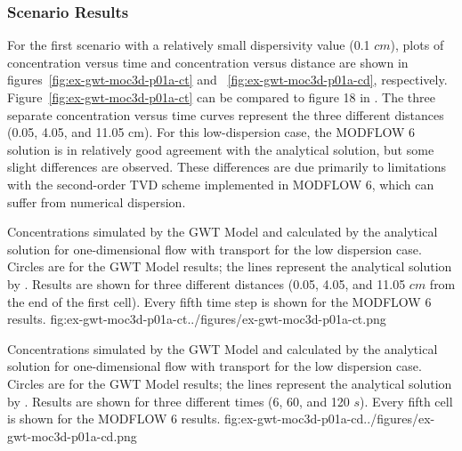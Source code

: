 

\subsubsection{Scenario Results}

For the first scenario with a relatively small dispersivity value (0.1 $cm$), plots of concentration versus time and concentration versus distance are shown in figures~\ref{fig:ex-gwt-moc3d-p01a-ct} and ~\ref{fig:ex-gwt-moc3d-p01a-cd}, respectively.  Figure~\ref{fig:ex-gwt-moc3d-p01a-ct} can be compared to figure 18 in \cite{konikow1996three}. The three separate concentration versus time curves represent the three different distances (0.05, 4.05, and 11.05 cm).  For this low-dispersion case, the MODFLOW 6 solution is in relatively good agreement with the analytical solution, but some slight differences are observed.  These differences are due primarily to limitations with the second-order TVD scheme implemented in MODFLOW 6, which can suffer from numerical dispersion.

\begin{StandardFigure}{
                                     Concentrations simulated by the \mf GWT Model and calculated by the analytical solution for one-dimensional flow with transport for the low dispersion case.  Circles are for the GWT Model results; the lines represent the analytical solution by \cite{wexler1992}.  Results are shown for three different distances (0.05, 4.05, and 11.05 $cm$ from the end of the first cell).  Every fifth time step is shown for the MODFLOW 6 results.
                                     }{fig:ex-gwt-moc3d-p01a-ct}{../figures/ex-gwt-moc3d-p01a-ct.png}
\end{StandardFigure}            

\begin{StandardFigure}{
                                     Concentrations simulated by the \mf GWT Model and calculated by the analytical solution for one-dimensional flow with transport for the low dispersion case.  Circles are for the GWT Model results; the lines represent the analytical solution by \cite{wexler1992}.  Results are shown for three different times (6, 60, and 120 $s$).  Every fifth cell is shown for the MODFLOW 6 results.
                                     }{fig:ex-gwt-moc3d-p01a-cd}{../figures/ex-gwt-moc3d-p01a-cd.png}
\end{StandardFigure}            


